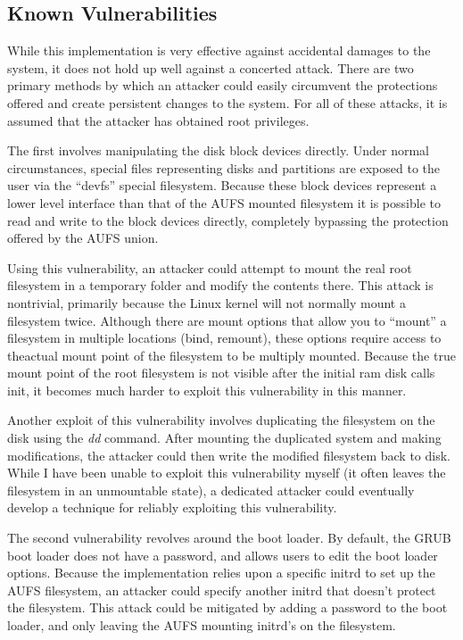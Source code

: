 \documentclass[12pt]{article}
\begin{document}
\subsection{Known Vulnerabilities}
While this implementation is very effective against accidental damages to
the system, it does not hold up well against a concerted attack. There are two
primary methods by which an attacker could easily circumvent the protections
offered and create persistent changes to the system. For all of these attacks,
it is assumed that the attacker has obtained root privileges.

The first involves manipulating the disk block devices directly. 
Under normal circumstances, special files representing disks and partitions
are exposed to the user via the ``devfs'' special filesystem.  Because these 
block devices represent a lower level interface than that of the AUFS mounted
filesystem it is possible to read and write to the block devices directly, 
completely bypassing the protection offered by the AUFS union.

Using this vulnerability, an attacker could attempt to mount the real root
filesystem in a temporary folder and modify the contents there.  This attack 
is nontrivial, primarily because the Linux kernel will not normally mount
a filesystem twice.  Although there are mount options that allow you to 
``mount'' a filesystem in multiple locations (bind, remount), 
these options require access to theactual mount point of the filesystem to 
be multiply mounted. Because the true mount point of the root filesystem is
not visible after the initial ram disk calls init, it becomes much harder to
exploit this vulnerability in this manner.

Another exploit of this vulnerability involves duplicating the filesystem on 
the disk using the \emph{dd} command.  After mounting the duplicated system
and making modifications, the attacker could then write the modified 
filesystem back to disk.  While I have been unable to exploit this 
vulnerability myself (it often leaves the filesystem in an unmountable state),
a dedicated attacker could eventually develop a technique for reliably 
exploiting this vulnerability.

The second vulnerability revolves around the boot loader.  By default, the 
GRUB boot loader does not have a password, and allows users to edit the boot
loader options.  Because the implementation relies upon a specific initrd
to set up the AUFS filesystem, an attacker could specify another initrd 
that doesn't protect the filesystem.  This attack could be mitigated by 
adding a password to the boot loader, and only leaving the AUFS mounting 
initrd's on the filesystem.
\end{document}
